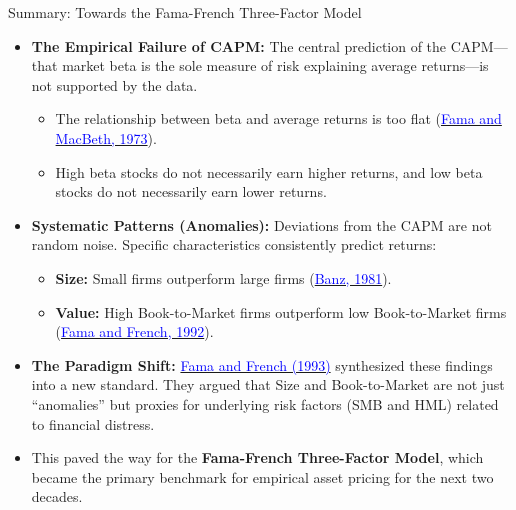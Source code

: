 \documentclass{beamer}
\begin{document}
\begin{frame}{Summary: Towards the Fama-French Three-Factor Model}
	\begin{itemize}
		\item \textbf{The Empirical Failure of CAPM:}
		The central prediction of the CAPM—that market beta is the sole measure of risk explaining average returns—is not supported by the data.
		\begin{itemize}
			\item The relationship between beta and average returns is too flat (\href{https://doi.org/10.1086/260061}{\textcolor{blue}{Fama and MacBeth, 1973}}).
			\item High beta stocks do not necessarily earn higher returns, and low beta stocks do not necessarily earn lower returns.
		\end{itemize}
		
		\item \textbf{Systematic Patterns (Anomalies):}
		Deviations from the CAPM are not random noise. Specific characteristics consistently predict returns:
		\begin{itemize}
			\item \textbf{Size:} Small firms outperform large firms (\href{https://doi.org/10.1016/0304-405X(81)90018-0}{\textcolor{blue}{Banz, 1981}}).
			\item \textbf{Value:} High Book-to-Market firms outperform low Book-to-Market firms (\href{https://doi.org/10.1111/j.1540-6261.1992.tb04398.x}{\textcolor{blue}{Fama and French, 1992}}).
		\end{itemize}
		
		\item \textbf{The Paradigm Shift:}
		\href{https://doi.org/10.1016/0304-405X(93)90023-5}{\textcolor{blue}{Fama and French (1993)}} synthesized these findings into a new standard. They argued that Size and Book-to-Market are not just ``anomalies'' but proxies for underlying risk factors (SMB and HML) related to financial distress.
		\item This paved the way for the \textbf{Fama-French Three-Factor Model}, which became the primary benchmark for empirical asset pricing for the next two decades.
	\end{itemize}
\end{frame}
\end{document}
